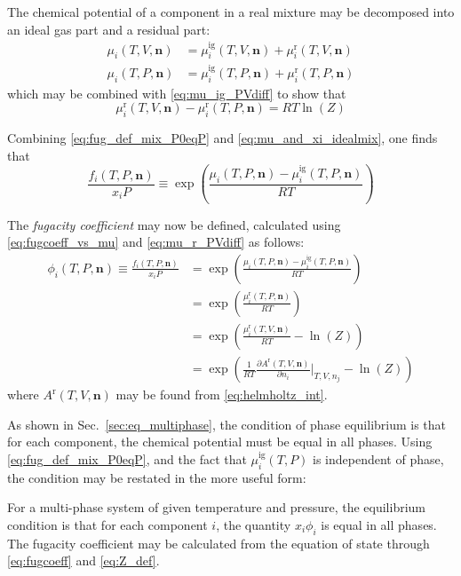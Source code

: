 \documentclass[internal,english]{sintefmemo2012}
\newcommand{\pone}[3]{\frac{\partial #1}{\partial #2}\bigg|_{#3}}%
\newcommand*{\vektor}[1]{\boldsymbol{#1}}%
\begin{document}
The chemical potential of a component in a real mixture may be decomposed into an ideal gas part and a residual part:
\begin{align}
  \mu_i(T,V,\vektor{n}) &= \mu_i^\text{ig}(T,V,\vektor{n}) + \mu_i^\text{r}(T,V,\vektor{n}) \nonumber\\
  \mu_i(T,P,\vektor{n}) &= \mu_i^\text{ig}(T,P,\vektor{n}) + \mu_i^\text{r}(T,P,\vektor{n})
  \label{}
\end{align}
which may be combined with \eqref{eq:mu_ig_PVdiff} to show that 
\begin{equation}
  \mu_i^\text{r}(T,V,\vektor{n}) - \mu_i^\text{r}(T,P,\vektor{n})
  =RT\ln \left( Z \right)
  \label{eq:mu_r_PVdiff}
\end{equation}

Combining \eqref{eq:fug_def_mix_P0eqP} and \eqref{eq:mu_and_xi_idealmix}, one finds that
\begin{equation}
  \frac{f_i(T,P,\vektor{n})}{x_i P} \equiv
  \exp\left( \frac{\mu_i(T,P,\vektor{n}) - \mu_i^\text{ig}(T,P,\vektor{n})}{RT} 
  \right)
  \label{eq:fugcoeff_vs_mu}
\end{equation}

The \textit{fugacity coefficient} may now be defined, calculated using \eqref{eq:fugcoeff_vs_mu} 
and \eqref{eq:mu_r_PVdiff} as follows:
\begin{align}
  \phi_i(T,P,\vektor{n}) \equiv \frac{f_i(T,P,\vektor{n})}{x_i P} &= 
  \exp\left( \frac{\mu_i(T,P,\vektor{n}) - \mu_i^\text{ig}(T,P,\vektor{n})}{RT}\right)
  \nonumber\\
  &= \exp\left( \frac{\mu_i^\text{r}(T,P,\vektor{n})}{RT} \right)
  \nonumber\\
  &= \exp\left( \frac{\mu_i^\text{r}(T,V,\vektor{n})}{RT} - \ln\left( Z \right) \right)
  \nonumber\\
  &= \exp\left( \frac{1}{RT}\pone{A^\text{r}(T,V,\vektor{n})}{n_i}{T,V,n_j} - \ln\left( Z \right) \right)
  \label{eq:fugcoeff}
\end{align}
where $A^\text{r}(T,V,\vektor{n})$ may be found from \eqref{eq:helmholtz_int}.

As shown in Sec.~\ref{sec:eq_multiphase}, the condition of phase equilibrium is that for each component, 
the chemical potential must be equal in all phases. Using \eqref{eq:fug_def_mix_P0eqP}, and the fact that 
$\mu_i^\text{ig}(T,P)$ is independent of phase, the condition may be restated in the more useful form:
\begin{framed}
  \noindent
  For a multi-phase system of given temperature and pressure, the equilibrium condition is that for each component $i$, the quantity 
  $x_i \phi_i$ is equal in all phases. The fugacity coefficient may be calculated from the equation of state through 
  \eqref{eq:fugcoeff} and \eqref{eq:Z_def}.
\end{framed}
\end{document}
